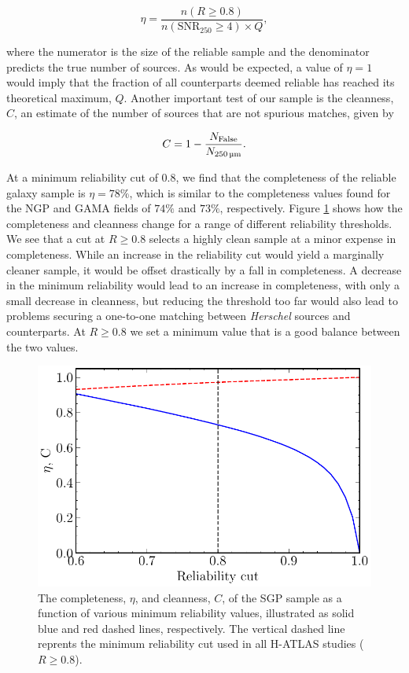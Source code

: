 \begin{equation}
    \eta = \frac{n(R \geq 0.8)}{n(\textrm{SNR}_{250} \geq 4) \times Q},
\label{eq:completeness}
\end{equation}

\noindent where the numerator is the size of the reliable sample and the denominator predicts the true number of sources. As would be expected, a value of $\eta = 1$ would imply that the fraction of all counterparts deemed reliable has reached its theoretical maximum, $Q$. Another important test of our sample is the cleanness, $C$, an estimate of the number of sources that are not spurious matches, given by

\begin{equation}
    C = 1 - \frac{N_{\textrm{False}}}{N_{\textrm{250\,\micron}}}.
\label{eq:cleanness}
\end{equation}

At a minimum reliability cut of $0.8$, we find that the completeness of the reliable galaxy sample is $\eta = 78\%$, which is similar to the completeness values found for the NGP and GAMA fields of $74\%$ and $73\%$, respectively. Figure \ref{fig:completeness_and_cleanness} shows how the completeness and cleanness change for a range of different reliability thresholds. We see that a cut at $R \geq 0.8$ selects a highly clean sample at a minor expense in completeness. While an increase in the reliability cut would yield a marginally cleaner sample, it would be offset drastically by a fall in completeness. A decrease in the minimum reliability would lead to an increase in completeness, with only a small decrease in cleanness, but reducing the threshold too far would also lead to problems securing a one-to-one matching between \textit{Herschel} sources and counterparts. At $R \geq 0.8$ we set a minimum value that is a good balance between the two values.

\begin{figure}
    \centering
	\includegraphics[width=0.8\columnwidth]{Figures/completeness_and_cleanness.pdf}
	\caption[Completeness and cleanness of the SGP sample as a function of reliability]{The completeness, $\eta$, and cleanness, $C$, of the SGP sample as a function of various minimum reliability values, illustrated as solid blue and red dashed lines, respectively. The vertical dashed line reprents the minimum reliability cut used in all H-ATLAS studies ($R \geq 0.8$).}
	\label{fig:completeness_and_cleanness}
\end{figure}

